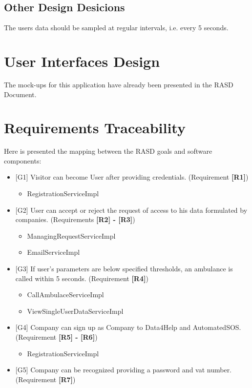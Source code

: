\documentclass{article}
\begin{document}
\subsection{Other Design Desicions}
The users data should be sampled at regular intervals, i.e. every 5 seconds.
\newpage
\section{User Interfaces Design}
The mock-ups for this application have already been presented in the RASD Document.
\section{Requirements Traceability}
Here is presented the mapping between the RASD goals and software components:
\begin{itemize}
	\item {[G1]} Visitor can become User after providing credentials. (Requirement \textbf{[R1]})
	\begin{itemize}
	\item RegistrationServiceImpl
	\end{itemize}
	\item {[G2]} User can accept or reject the request of access to his data formulated by companies. (Requirements \textbf{[R2] - [R3]})
	\begin{itemize}
	\item ManagingRequestServiceImpl
	\item EmailServiceImpl
	\end{itemize}
	\item {[G3]} If user's parameters are below specified thresholds, an ambulance is called within 5 seconds. (Requirement \textbf{[R4]}) 
	\begin{itemize}
	\item CallAmbulaceServiceImpl
	\item ViewSingleUserDataServiceImpl
	\end{itemize}
	\item {[G4]} Company can sign up as Company to Data4Help and AutomatedSOS. (Requirement \textbf{[R5] - [R6]})
	\begin{itemize}
	\item RegistrationServiceImpl
	\end{itemize}
	\item {[G5]} Company can be recognized providing a password and vat number. (Requirement \textbf{[R7]})
	\begin{itemize}

\end{itemize}
\end{itemize}
\end{document}
